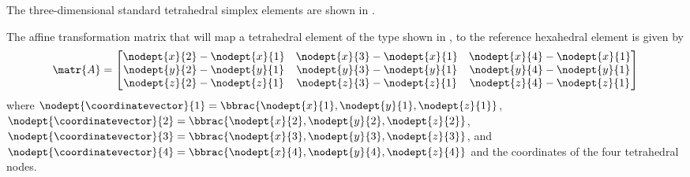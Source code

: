 The three-dimensional standard tetrahedral simplex elements are shown in .


The affine transformation matrix that will map a tetrahedral element of
the type shown in , to the
reference hexahedral element is given by
\begin{equation}
  \matr{A}=\begin{bmatrix}
  \nodept{x}{2}-\nodept{x}{1} & \nodept{x}{3}-\nodept{x}{1} & \nodept{x}{4}-\nodept{x}{1}\\
  \nodept{y}{2}-\nodept{y}{1} & \nodept{y}{3}-\nodept{y}{1} & \nodept{y}{4}-\nodept{y}{1}\\
  \nodept{z}{2}-\nodept{z}{1} & \nodept{z}{3}-\nodept{z}{1} & \nodept{z}{4}-\nodept{z}{1}
  \end{bmatrix}
  \label{eqn:TetrahedralAffineTransformation}
\end{equation}
where
$\nodept{\coordinatevector}{1}=\bbrac{\nodept{x}{1},\nodept{y}{1},\nodept{z}{1}}$,
$\nodept{\coordinatevector}{2}=\bbrac{\nodept{x}{2},\nodept{y}{2},\nodept{z}{2}}$,
$\nodept{\coordinatevector}{3}=\bbrac{\nodept{x}{3},\nodept{y}{3},\nodept{z}{3}}$,
and
$\nodept{\coordinatevector}{4}=\bbrac{\nodept{x}{4},\nodept{y}{4},\nodept{z}{4}}$
and the coordinates of the four tetrahedral nodes.

